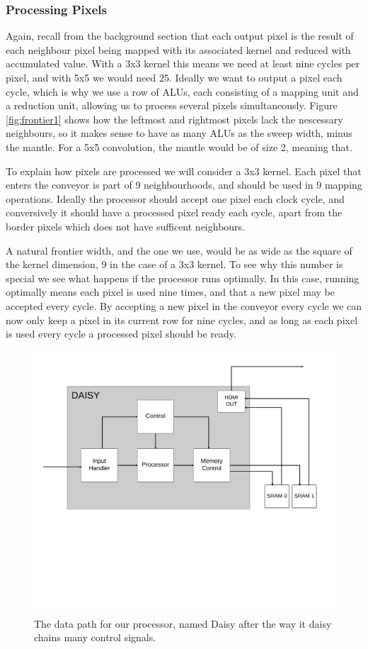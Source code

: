 \subsubsection{Processing Pixels}
Again, recall from the background section that each output pixel is the result of each neighbour pixel being mapped with its associated kernel and reduced with accumulated value.
With a 3x3 kernel this means we need at least nine cycles per pixel, and with 5x5 we would need 25.
Ideally we want to output a pixel each cycle, which is why we use a row of ALUs, each consisting of a mapping unit and a reduction unit, allowing us to process several pixels simultaneously.
Figure \ref{fig:frontier1} shows how the leftmost and rightmost pixels lack the nescessary neighbours, so it makes sense to have as many ALUs as the sweep width, minus the mantle.
For a 5x5 convolution, the mantle would be of size 2, meaning that.

To explain how pixels are processed we will consider a 3x3 kernel.
Each pixel that enters the conveyor is part of 9 neighbourhoods, and should be used in 9 mapping operations.
Ideally the processor should accept one pixel each clock cycle, and conversively it should have a processed pixel ready each cycle, apart from the border pixels which does not have sufficent neighbours.


A natural frontier width, and the one we use, would be as wide as the square of the kernel dimension, 9 in the case of a 3x3 kernel.
To see why this number is special we see what happens if the processor runs optimally.
In this case, running optimally means each pixel is used nine times, and that a new pixel may be accepted every cycle.
By accepting a new pixel in the conveyor every cycle we can now only keep a pixel in its current row for nine cycles, and as long as each pixel is used every cycle a processed pixel should be ready.

\begin{figure}[h!]
    \includegraphics[width=\linewidth]{img/daisy_overview.png}
    \caption{The data path for our processor, named Daisy after the way it daisy chains many control signals.}
    \label{fig:Convolution}
\end{figure}

